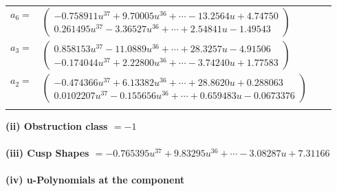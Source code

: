 \documentclass[1p]{elsarticle_modified}
\theoremstyle{definition}
\begin{document}
\begin{tabular}{m{7pt} m{180pt} m{7pt} m{180pt} }
\flushright $a_{6}=$&$\begin{pmatrix}-0.758911 u^{37}+9.70005 u^{36}+\cdots-13.2564 u+4.74750\\0.261495 u^{37}-3.36527 u^{36}+\cdots+2.54841 u-1.49543\end{pmatrix}$ \\
\flushright $a_{3}=$&$\begin{pmatrix}0.858153 u^{37}-11.0889 u^{36}+\cdots+28.3257 u-4.91506\\-0.174044 u^{37}+2.22800 u^{36}+\cdots-3.74240 u+1.77583\end{pmatrix}$ \\
\flushright $a_{2}=$&$\begin{pmatrix}-0.474366 u^{37}+6.13382 u^{36}+\cdots+28.8620 u+0.288063\\0.0102207 u^{37}-0.155656 u^{36}+\cdots+0.659483 u-0.0673376\end{pmatrix}$\\&\end{tabular}
\flushleft \textbf{(ii) Obstruction class $= -1$}\\~\\
\flushleft \textbf{(iii) Cusp Shapes $= -0.765395 u^{37}+9.83295 u^{36}+\cdots-3.08287 u+7.31166$}\\~\\
\newpage\renewcommand{\arraystretch}{1}
\flushleft \textbf{(iv) u-Polynomials at the component}\newline \\
\end{document}
